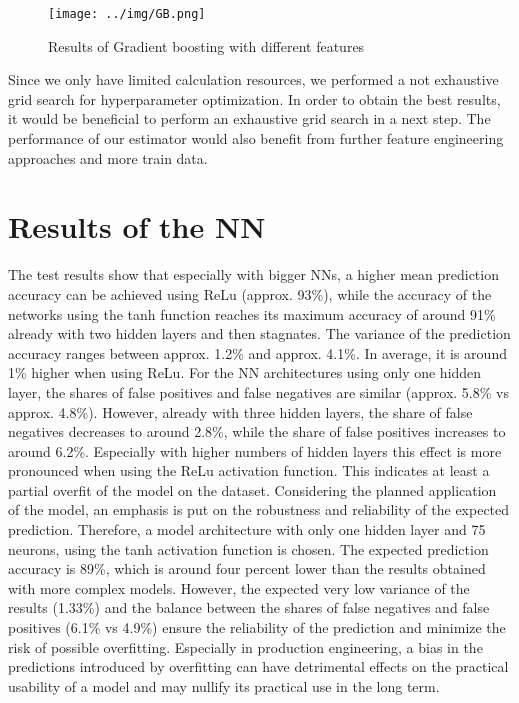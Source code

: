 \documentclass[12pt]{report}
\begin{document}
\begin{figure}[H]
	\centering
	\texttt{[image: ../img/GB.png]}
	\caption{Results of Gradient boosting with different features
	}
	\label{fig:GB}
\end{figure}

Since we only have limited calculation resources, we performed a not exhaustive grid search for hyperparameter optimization. In order to obtain the best results, it would be beneficial to perform an exhaustive grid search in a next step. The performance of our estimator would also benefit from further feature engineering approaches and more train data. 

\section{Results of the NN}


The test results show that especially with bigger NNs, a higher mean prediction accuracy can be achieved using ReLu (approx. 93\%), while the accuracy of the networks using the tanh function reaches its maximum accuracy of around 91\% already with two hidden layers and then stagnates.
The variance of the prediction accuracy ranges between approx. 1.2\% and approx. 4.1\%. In average, it is around 1\% higher when using ReLu.
For the NN architectures using only one hidden layer, the shares of false positives and false negatives are similar (approx. 5.8\% vs approx. 4.8\%). However, already with three hidden layers, the share of false negatives decreases to around 2.8\%, while the share of false positives increases to around 6.2\%. Especially with higher numbers of hidden layers this effect is more pronounced when using the ReLu activation function. This indicates at least a partial overfit of the model on the dataset.
Considering the planned application of the model, an emphasis is put on the robustness and reliability of the expected prediction. Therefore, a model architecture with only one hidden layer and 75 neurons, using the tanh activation function is chosen. The expected prediction accuracy is 89\%, which is around four percent lower than the results obtained with more complex models. However, the expected very low variance of the results (1.33\%) and the balance between the shares of false negatives and false positives (6.1\% vs 4.9\%) ensure the reliability of the prediction and minimize the risk of possible overfitting. Especially in production engineering, a bias in the predictions introduced by overfitting can have detrimental effects on the practical usability of a model and may nullify its practical use in the long term.
\end{document}
